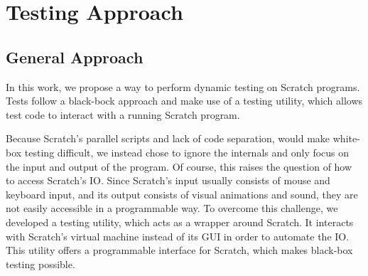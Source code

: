 
\chapter{Testing Approach}


\section{General Approach}

In this work, we propose a way to perform dynamic testing on Scratch programs.
Tests follow a black-bock approach and make use of a testing utility, which allows test code to interact with a running Scratch program.

Because Scratch's parallel scripts and lack of code separation, would make white-box testing difficult,
we instead chose to ignore the internals and only focus on the input and output of the program.
Of course, this raises the question of how to access Scratch's IO.
Since Scratch's input usually consists of mouse and keyboard input, and its output consists of visual animations and sound,
they are not easily accessible in a programmable way.
To overcome this challenge, we developed a testing utility, which acts as a wrapper around Scratch.
It interacts with Scratch's virtual machine instead of its GUI in order to automate the IO.
This utility offers a programmable interface for Scratch, which makes black-box testing possible.




